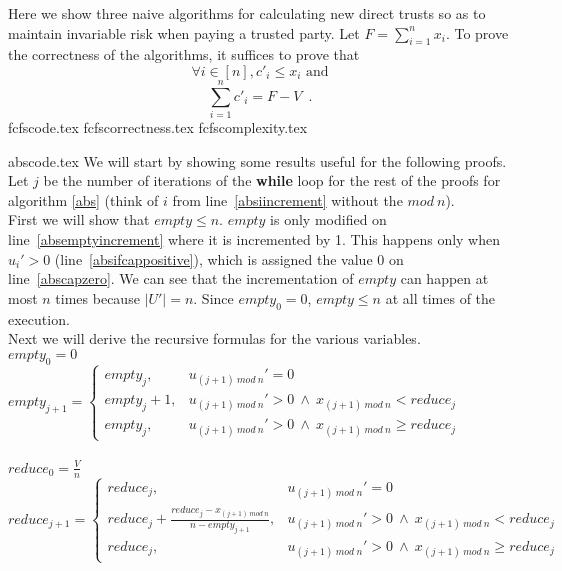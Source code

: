 \documentclass[11pt]{llncs}
\begin{document}
  Here we show three naive algorithms for calculating new direct trusts so as to maintain invariable risk when paying
  a trusted party. Let $F = \sum\limits_{i=1}^{n}x_i$. To prove the correctness of the algorithms, it suffices to prove that
  \begin{equation}
  \label{naive:req1}
     \forall i \in [n], c'_i \leq x_i \mbox{ and}
  \end{equation}
  \begin{equation}
  \label{naive:req2}
     \sum\limits_{i=1}^{n}c'_i = F - V \enspace.
  \end{equation}
  {fcfscode.tex}
  {fcfscorrectness.tex}
  {fcfscomplexity.tex}

  {abscode.tex}
  \noindent
  We will start by showing some results useful for the following proofs. Let $j$ be the number of iterations of the
  \textbf{while} loop for the rest of the proofs for algorithm \ref{abs} (think of $i$ from line~\ref{absiincrement}
  without the $mod\:n$).\\
  First we will show that $empty \leq n$. $empty$ is only modified on line~\ref{absemptyincrement} where it is
  incremented by 1. This happens only when $u_i' > 0$ (line~\ref{absifcappositive}), which is assigned the value 0 on
  line~\ref{abscapzero}. We can see that the incrementation of $empty$ can happen at most $n$ times because
  $|U'| = n$. Since $empty_0 = 0$, $empty \leq n$ at all times of the execution. \\
  Next we will derive the recursive formulas for the various variables. \\
  $empty_0 = 0$ \\
  $empty_{j+1} = 
     \begin{cases}
        empty_j, & u_{(j+1)\:mod\:n}' = 0 \\
        empty_j+1, & u_{(j+1)\:mod\:n}' > 0 \: \wedge \: x_{(j+1) \:mod\:n} < reduce_j \\
        empty_j, & u_{(j+1)\:mod\:n}' > 0 \: \wedge \: x_{(j+1) \:mod\:n} \geq reduce_j
     \end{cases}$ \\ \ \\
  $reduce_0 = \frac{V}{n}$ \\
  $reduce_{j+1} =
     \begin{cases}
        reduce_j, & u_{(j+1)\:mod\:n}' = 0 \\
        reduce_j + \frac{reduce_j-x_{(j+1)\:mod\:n}}{n-empty_{j+1}}, & u_{(j+1)\:mod\:n}' > 0 \: \wedge \:
           x_{(j+1) \:mod\:n} < reduce_j \\
        reduce_j, & u_{(j+1)\:mod\:n}' > 0 \: \wedge \: x_{(j+1) \:mod\:n} \geq reduce_j
     \end{cases}$ \\ \ \\
\end{document}
